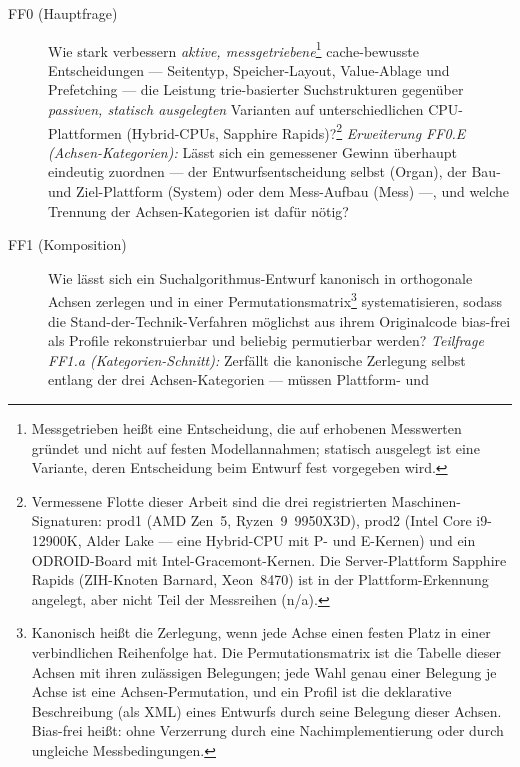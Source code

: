 \begin{description}
  \item[FF0 (Hauptfrage)] Wie stark verbessern \emph{aktive, messgetriebene}\footnote{Messgetrieben
  heißt eine Entscheidung, die auf erhobenen Messwerten gründet und nicht auf festen Modellannahmen;
  statisch ausgelegt ist eine Variante, deren Entscheidung beim Entwurf fest vorgegeben wird.}
  cache-bewusste
  Entscheidungen --- Seitentyp, Speicher-Layout, Value-Ablage und Prefetching --- die Leistung
  trie-basierter Suchstrukturen gegenüber \emph{passiven, statisch ausgelegten} Varianten auf
  unterschiedlichen CPU-Plattformen (Hybrid-CPUs, Sapphire
  Rapids)?\footnote{Vermessene Flotte dieser Arbeit sind die drei registrierten
  Maschinen-Signaturen: prod1 (AMD Zen~5, Ryzen~9~9950X3D), prod2 (Intel Core i9-12900K, Alder Lake --- %
  eine Hybrid-CPU mit P- und E-Kernen) und ein ODROID-Board mit Intel-Gracemont-Kernen. Die
  Server-Plattform Sapphire
  Rapids (ZIH-Knoten Barnard, Xeon~8470) ist in der Plattform-Erkennung angelegt, aber nicht Teil der
  Messreihen (n/a).}
  \emph{Erweiterung FF0.E (Achsen-Kategorien):} Lässt sich ein gemessener Gewinn überhaupt eindeutig
  zuordnen --- der Entwurfsentscheidung selbst (Organ), der Bau- und Ziel-Plattform (System) oder
  dem Mess-Aufbau (Mess) ---, und welche Trennung der Achsen-Kategorien ist dafür nötig?
  \item[FF1 (Komposition)] Wie lässt sich ein Suchalgorithmus-Entwurf kanonisch in orthogonale
  Achsen zerlegen und in einer Permutationsmatrix\footnote{Kanonisch heißt die Zerlegung, wenn jede
  Achse einen festen Platz in einer verbindlichen Reihenfolge hat. Die Permutationsmatrix ist die
  Tabelle dieser Achsen mit ihren zulässigen Belegungen; jede Wahl genau einer Belegung je Achse ist
  eine Achsen-Permutation, und ein Profil ist die deklarative Beschreibung (als XML) eines Entwurfs
  durch seine Belegung dieser Achsen. Bias-frei heißt: ohne Verzerrung durch eine Nachimplementierung
  oder durch ungleiche Messbedingungen.} systematisieren, sodass die
  Stand-der-Technik-Verfahren möglichst aus ihrem Originalcode bias-frei als Profile
  rekonstruierbar und beliebig permutierbar werden? \emph{Teilfrage FF1.a (Kategorien-Schnitt):} Zerfällt
  die kanonische Zerlegung selbst entlang der drei Achsen-Kategorien --- müssen Plattform- und

\end{description}
